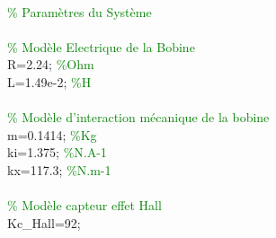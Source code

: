 \hspace{1mm} \\ 
\hspace{1mm}\textcolor{green}{\% Paramètres du Système }\\ 
\hspace{1mm} \\ 
\hspace{1mm}\textcolor{green}{\% Modèle Electrique de la Bobine }\\ 
\hspace{1mm}R=2.24; \textcolor{green}{\%Ohm }\\ 
\hspace{1mm}L=1.49e-2; \textcolor{green}{\%H }\\ 
\hspace{1mm} \\ 
\hspace{1mm}\textcolor{green}{\% Modèle d'interaction mécanique de la bobine }\\ 
\hspace{1mm}m=0.1414; \textcolor{green}{\%Kg }\\ 
\hspace{1mm}ki=1.375; \textcolor{green}{\%N.A-1 }\\ 
\hspace{1mm}kx=117.3; \textcolor{green}{\%N.m-1 }\\ 
\hspace{1mm} \\ 
\hspace{1mm}\textcolor{green}{\% Modèle capteur effet Hall }\\ 
\hspace{1mm}Kc\_Hall=92;  \\ 
\hspace{1mm} \\ 
